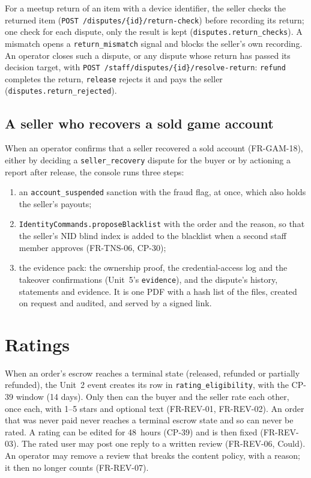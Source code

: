 \documentclass[11pt,a4paper]{article}
\begin{document}
For a meetup return of an item with a device identifier, the seller checks the returned item (\texttt{POST /disputes/\{id\}/return-check}) before recording its return; one check for each dispute, only the result is kept (\texttt{disputes.return\_checks}). A mismatch opens a \texttt{return\_mismatch} signal and blocks the seller's own recording. An operator closes such a dispute, or any dispute whose return has passed its decision target, with \texttt{POST /staff/disputes/\{id\}/resolve-return}: \texttt{refund} completes the return, \texttt{release} rejects it and pays the seller (\texttt{disputes.return\_rejected}).

\subsection{A seller who recovers a sold game account}
\label{sec:gam18}
When an operator confirms that a seller recovered a sold account (FR-GAM-18), either by deciding a \texttt{seller\_recovery} dispute for the buyer or by actioning a report after release, the console runs three steps:
\begin{enumerate}[nosep]
  \item an \texttt{account\_suspended} sanction with the fraud flag, at once, which also holds the seller's payouts;
  \item \texttt{IdentityCommands.proposeBlacklist} with the order and the reason, so that the seller's NID blind index is added to the blacklist when a second staff member approves (FR-TNS-06, CP-30);
  \item the evidence pack: the ownership proof, the credential-access log and the takeover confirmations (Unit~5's \texttt{evidence}), and the dispute's history, statements and evidence. It is one PDF with a hash list of the files, created on request and audited, and served by a signed link.
\end{enumerate}

\section{Ratings}
\label{sec:ratings}
When an order's escrow reaches a terminal state (released, refunded or partially refunded), the Unit~2 event creates its row in \texttt{rating\_eligibility}, with the CP-39 window (14 days). Only then can the buyer and the seller rate each other, once each, with 1--5 stars and optional text (FR-REV-01, FR-REV-02). An order that was never paid never reaches a terminal escrow state and so can never be rated. A rating can be edited for 48~hours (CP-39) and is then fixed (FR-REV-03). The rated user may post one reply to a written review (FR-REV-06, Could). An operator may remove a review that breaks the content policy, with a reason; it then no longer counts (FR-REV-07).
\end{document}
